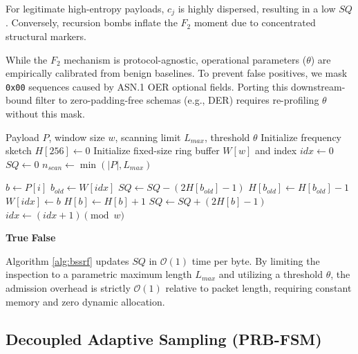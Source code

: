 \documentclass[conference]{IEEEtran}
\begin{document}
For legitimate high-entropy payloads, $c_j$ is highly dispersed, resulting in a low $SQ$. Conversely, recursion bombs inflate the $F_2$ moment due to concentrated structural markers. 

While the $F_2$ mechanism is protocol-agnostic, operational parameters ($\theta$) are empirically calibrated from benign baselines. To prevent false positives, we mask \texttt{0x00} sequences caused by ASN.1 OER optional fields. Porting this downstream-bound filter to zero-padding-free schemas (e.g., DER) requires re-profiling $\theta$ without this mask.

\begin{algorithm}[!ht]
\caption{Bounded Streaming Structural Risk Filter}
\label{alg:bssrf}
\begin{algorithmic}[1]
\Require Payload $P$, window size $w$, scanning limit $L_{max}$, threshold $\theta$
\State Initialize frequency sketch $H[256] \gets 0$
\State Initialize fixed-size ring buffer $W[w]$ and index $idx \gets 0$
\State $SQ \gets 0$ 
\State $n_{scan} \gets \min(|P|, L_{max})$

    \State $b \gets P[i]$
        \State $b_{old} \gets W[idx]$
        \State $SQ \gets SQ - (2H[b_{old}] - 1)$
        \State $H[b_{old}] \gets H[b_{old}] - 1$
    \EndIf
    \State $W[idx] \gets b$
    \State $H[b] \gets H[b] + 1$
    \State $SQ \gets SQ + (2H[b] - 1)$ 
    \State $idx \gets (idx + 1) \pmod{w}$

        \State \Return \textbf{True} 
    \EndIf
\EndFor
\State \Return \textbf{False}
\end{algorithmic}
\end{algorithm}

Algorithm \ref{alg:bssrf} updates $SQ$ in $\mathcal{O}(1)$ time per byte. By limiting the inspection to a parametric maximum length $L_{max}$ and utilizing a threshold $\theta$, the admission overhead is strictly $\mathcal{O}(1)$ relative to packet length, requiring constant memory and zero dynamic allocation.

\subsection{Decoupled Adaptive Sampling (PRB-FSM)}
\end{document}
